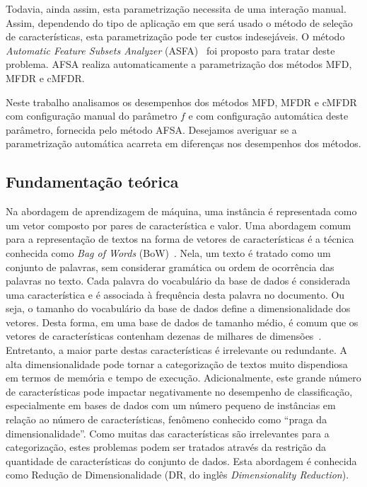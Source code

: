 \documentclass[conference]{IEEEtran}
\begin{document}
Todavia, ainda assim, esta parametrização necessita de uma interação manual. Assim, dependendo do tipo de aplicação em que será usado o método de seleção de características, esta parametrização pode ter custos indesejáveis. O método \textit{Automatic Feature Subsets Analyzer} (ASFA)~\cite{fragoso2016afsa} foi proposto para tratar deste problema. AFSA realiza automaticamente a parametrização dos métodos MFD, MFDR e cMFDR.

Neste trabalho analisamos os desempenhos dos métodos MFD, MFDR e cMFDR com configuração manual do parâmetro $f$ e com configuração automática deste parâmetro, fornecida pelo método AFSA. Desejamos averiguar se a parametrização automática acarreta em diferenças nos desempenhos dos métodos.

\subsection{Fundamentação teórica}
\label{sec:fundamentacao}

Na abordagem de aprendizagem de máquina, uma instância é representada como um vetor composto por pares de característica e valor.
Uma abordagem comum para a representação de textos na forma de vetores de características é a técnica conhecida como \emph{Bag of Words} (BoW)~\cite{guyon2003introduction}. Nela, um texto é tratado como um conjunto de palavras, sem considerar gramática ou ordem de ocorrência das palavras no texto.
Cada palavra do vocabulário da base de dados é considerada uma característica e é associada à frequência desta palavra no documento. Ou seja, o tamanho do vocabulário da base de dados define a dimensionalidade dos vetores.
Desta forma, em uma base de dados de tamanho médio, é comum que os vetores de características contenham dezenas de milhares de dimensões~\cite{gabrilovich2004text}. Entretanto, a maior parte destas características é irrelevante ou redundante. A alta dimensionalidade pode tornar a categorização de textos muito dispendiosa em termos de memória e tempo de execução.
Adicionalmente, este grande número de características pode impactar negativamente no desempenho de classificação, especialmente em bases de dados com um número pequeno de instâncias em relação ao número de características, fenômeno conhecido como ``praga da dimensionalidade''.
Como muitas das características são irrelevantes para a categorização, estes problemas podem ser tratados através da restrição da quantidade de características do conjunto de dados. Esta abordagem é conhecida como Redução de Dimensionalidade (DR, do inglês \emph{Dimensionality Reduction}).
\end{document}
